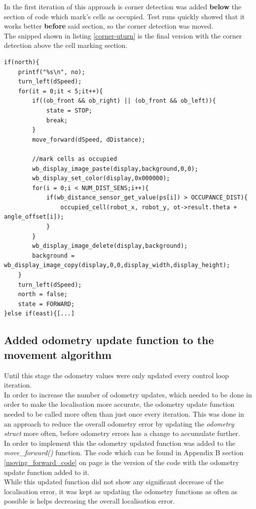 In the first iteration of this approach is corner detection was added \textbf{below} the section of code which mark's cells as occupied. Test runs quickly showed that it works better \textbf{before} said section, so the corner detection was moved.\\
The snipped shown in listing \ref{corner-uturn} is the final version with the corner detection above the cell marking section.

\begin{lstlisting}[caption={Corner detection added to the U-turn routine}, label={corner-uturn}]
if(north){
    printf("%s\n", no);
    turn_left(dSpeed);
    for(it = 0;it < 5;it++){
        if((ob_front && ob_right) || (ob_front && ob_left)){
            state = STOP;
            break;
        }
        move_forward(dSpeed, dDistance);

        //mark cells as occupied
        wb_display_image_paste(display,background,0,0);
        wb_display_set_color(display,0x000000);
        for(i = 0;i < NUM_DIST_SENS;i++){
            if(wb_distance_sensor_get_value(ps[i]) > OCCUPANCE_DIST){
                occupied_cell(robot_x, robot_y, ot->result.theta + angle_offset[i]);
            }
        }
        wb_display_image_delete(display,background);
        background = wb_display_image_copy(display,0,0,display_width,display_height);
    }
    turn_left(dSpeed);
    north = false;
    state = FORWARD;
}else if(east){[...]
\end{lstlisting}

\subsection{Added odometry update function to the movement algorithm}
Until this stage the odometry values were only updated every control loop iteration. \\
In order to increase the number of odometry updates, which needed to be done in order to make the localisation more accurate, the odometry update function needed to be called more often than just once every iteration.
This was done in an approach to reduce the overall odometry error  by updating the \textit{odometry struct} more often, before odometry errors has a change to accumulate further. \\[3ex]

In order to implement this the odometry updated function was added to the \textit{move\_forward()} function.
The code which can be found in Appendix B section \ref{moving_forward_code} on page \pageref{moving_forward_code} is the version of the code with the odometry update function added to it. \\
While this updated function did not show any significant decrease of the localisation error, it was kept as updating the odometry functions as often as possible is helps decreasing the overall localisation error.

